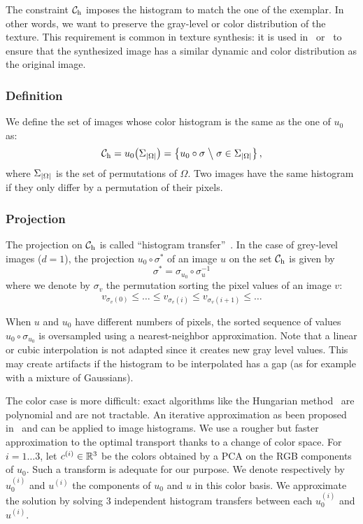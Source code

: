 The constraint ${\mathcal{C}_{\mathrm{h}}}$ imposes the histogram to match the one of the exemplar.
In other words, we want to preserve the gray-level or color distribution of the texture.
This requirement is common in texture synthesis: it is used in~\cite{Heeger1995} or~\cite{peyre2009sparse} to ensure that the synthesized image has a similar dynamic and color distribution as the original image.


\subsubsection{Definition}

We define the set of images whose color histogram is the same as the one of $u_0$ as:
\begin{equation}
  {\mathcal{C}_{\mathrm{h}}}
    = u_0 \big(\Sigma_{\left|\Omega\right|}\big)
    = \left\{ u_0\circ\sigma \mathrel{}\middle\backslash\mathrel{} \sigma\in\Sigma_{{\left|\Omega\right|}} \right\},
\end{equation}
where $\Sigma_{{\left|\Omega\right|}}$ is the set of permutations of $\Omega$.
Two images have the same histogram if they only differ by a permutation of their pixels.


\subsubsection{Projection}

The projection on ${\mathcal{C}_{\mathrm{h}}}$ is called ``histogram transfer''~\cite{pitie2005n}.
In the case of grey-level images ($d=1$), the projection $u_0\circ\sigma^*$ of an image $u$ on the set ${\mathcal{C}_{\mathrm{h}}}$ is given by
\begin{equation}
  \sigma^*=\sigma_{u_0}\circ\sigma_u^{-1}
\end{equation}
where we denote by $\sigma_v$ the permutation sorting the pixel values of an image $v$:
\begin{equation*}
  v_{\sigma_v(0)} \leq\dots\leq v_{\sigma_v(i)} \leq v_{\sigma_v(i+1)} \leq\dots
\end{equation*}

When $u$ and $u_0$ have different numbers of pixels, the sorted sequence of values $u_0\circ\sigma_{u_0}$ is oversampled using a nearest-neighbor approximation.
Note that a linear or cubic interpolation is not adapted since it creates new gray level values.
This may create artifacts if the histogram to be interpolated has a gap (as for example with a mixture of Gaussians).

The color case is more difficult: exact algorithms like the Hungarian method~\cite{kuhn1955hungarian} are polynomial and are not tractable.
An iterative approximation as been proposed in~\cite{rabin2012wasserstein} and can be applied to image histograms.
We use a rougher but faster approximation to the optimal transport thanks to a change of color space.
For $i=1\dots3$, let $c^{(i)}\in\mathbb{R}^3$  be the colors obtained by a PCA on the RGB components of $u_0$.
Such a transform is adequate for our purpose. %
We denote respectively by $u_0^{(i)}$ and $u^{(i)}$ the components of $u_0$ and $u$ in this color basis.
We approximate the solution by solving 3 independent histogram transfers between each $u_0^{(i)}$ and $u^{(i)}$.


